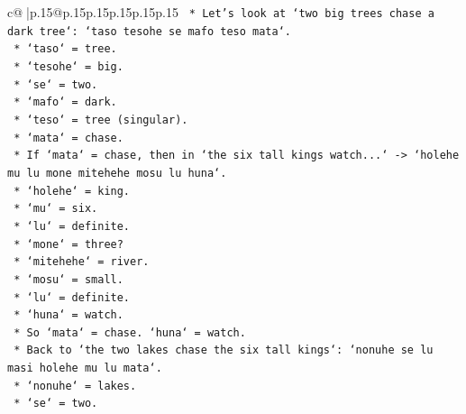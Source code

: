 \documentclass{article}
\begin{document}
{\begin{supertabular}{c@{$\;$}|p{.15\linewidth}@{}p{.15\linewidth}p{.15\linewidth}p{.15\linewidth}p{.15\linewidth}p{.15\linewidth}}
{{{\texttt{                                            *   Let's look at `two big trees chase a dark tree`: `taso tesohe se mafo teso mata`.} \\
\texttt{                                                *   `taso` = tree.} \\
\texttt{                                                *   `tesohe` = big.} \\
\texttt{                                                *   `se` = two.} \\
\texttt{                                                *   `mafo` = dark.} \\
\texttt{                                                *   `teso` = tree (singular).} \\
\texttt{                                                *   `mata` = chase.} \\
\texttt{                                            *   If `mata` = chase, then in `the six tall kings watch...` {-}> `holehe mu lu mone mitehehe mosu lu huna`.} \\
\texttt{                                                *   `holehe` = king.} \\
\texttt{                                                *   `mu` = six.} \\
\texttt{                                                *   `lu` = definite.} \\
\texttt{                                                *   `mone` = three?} \\
\texttt{                                                *   `mitehehe` = river.} \\
\texttt{                                                *   `mosu` = small.} \\
\texttt{                                                *   `lu` = definite.} \\
\texttt{                                                *   `huna` = watch.} \\
\texttt{                                            *   So `mata` = chase. `huna` = watch.} \\
\texttt{                                            *   Back to `the two lakes chase the six tall kings`: `nonuhe se lu masi holehe mu lu mata`.} \\
\texttt{                                                *   `nonuhe` = lakes.} \\
\texttt{                                                *   `se` = two.} \\
}}}
\end{supertabular}}
\end{document}
